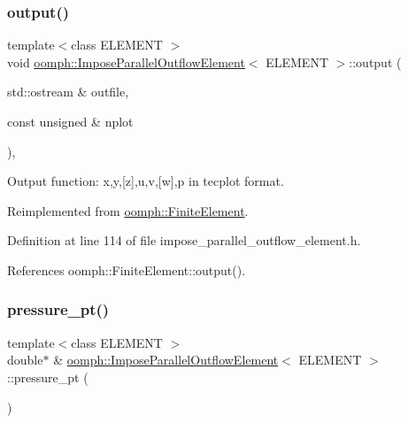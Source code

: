 \subsubsection{\texorpdfstring{output()}{output()}\hspace{0.1cm}{\footnotesize\ttfamily [2/2]}}
{\footnotesize\ttfamily template$<$class E\+L\+E\+M\+E\+NT $>$ \\
void \hyperlink{classoomph_1_1ImposeParallelOutflowElement}{oomph\+::\+Impose\+Parallel\+Outflow\+Element}$<$ E\+L\+E\+M\+E\+NT $>$\+::output (\begin{DoxyParamCaption}\item[{std\+::ostream \&}]{outfile,  }\item[{const unsigned \&}]{nplot }\end{DoxyParamCaption})\hspace{0.3cm}{\ttfamily [inline]}, {\ttfamily [virtual]}}



Output function\+: x,y,\mbox{[}z\mbox{]},u,v,\mbox{[}w\mbox{]},p in tecplot format. 



Reimplemented from \hyperlink{classoomph_1_1FiniteElement_afa9d9b2670f999b43e6679c9dd28c457}{oomph\+::\+Finite\+Element}.



Definition at line 114 of file impose\+\_\+parallel\+\_\+outflow\+\_\+element.\+h.



References oomph\+::\+Finite\+Element\+::output().

\mbox{\label{classoomph_1_1ImposeParallelOutflowElement_a03c7adc09a78f610650b9326cc717007}} 
\subsubsection{\texorpdfstring{pressure\+\_\+pt()}{pressure\_pt()}}
{\footnotesize\ttfamily template$<$class E\+L\+E\+M\+E\+NT $>$ \\
double$\ast$ \& \hyperlink{classoomph_1_1ImposeParallelOutflowElement}{oomph\+::\+Impose\+Parallel\+Outflow\+Element}$<$ E\+L\+E\+M\+E\+NT $>$\+::pressure\+\_\+pt (\begin{DoxyParamCaption}{ }\end{DoxyParamCaption})\hspace{0.3cm}{\ttfamily [inline]}}



